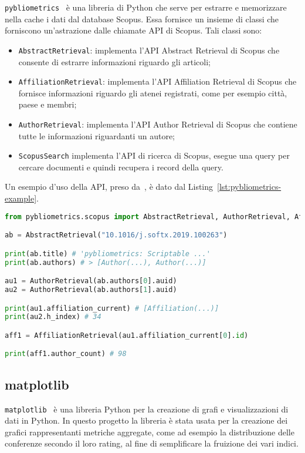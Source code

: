 \texttt{pybliometrics}~\cite{pybliometrics} è una libreria di Python che serve per estrarre e
memorizzare nella cache i dati dal database Scopus.
Essa fornisce un insieme di classi che forniscono un'astrazione dalle chiamate
API di Scopus. Tali classi sono:
\begin{itemize}
	\item \texttt{AbstractRetrieval}: implementa l'API Abstract Retrieval di
	Scopus che consente di estrarre informazioni riguardo gli articoli;
	\item \texttt{AffiliationRetrieval}: implementa l'API Affiliation Retrieval
	di Scopus che fornisce informazioni riguardo gli atenei registrati, come per
	esempio città, paese e membri;
	\item \texttt{AuthorRetrieval}: implementa l'API Author Retrieval di Scopus
	che contiene tutte le informazioni riguardanti un autore;
	\item \texttt{ScopusSearch} implementa l'API di ricerca di Scopus, esegue una
	query per cercare documenti e quindi recupera i record della query.
\end {itemize}

Un esempio d'uso della API, preso da~\cite{pybliometrics}, è dato dal
Listing~\ref{lst:pybliometrics-example}.

\begin{lstlisting}[language=Python, caption=Esempio d'uso di \texttt{pybliometrics}, label=lst:pybliometrics-example]
from pybliometrics.scopus import AbstractRetrieval, AuthorRetrieval, AffiliationRetrieval

ab = AbstractRetrieval("10.1016/j.softx.2019.100263")

print(ab.title) # 'pybliometrics: Scriptable ...'
print(ab.authors) # > [Author(...), Author(...)]

au1 = AuthorRetrieval(ab.authors[0].auid)
au2 = AuthorRetrieval(ab.authors[1].auid)

print(au1.affiliation_current) # [Affiliation(...)]
print(au2.h_index) # 34

aff1 = AffiliationRetrieval(au1.affiliation_current[0].id)

print(aff1.author_count) # 98
\end{lstlisting}

\subsection{matplotlib}

\texttt{matplotlib}~\cite{matplotlib} è una libreria Python per la creazione
di grafi e visualizzazioni di dati in Python. In questo progetto la libreria
è stata usata per la creazione dei grafici rappresentanti metriche aggregate,
come ad esempio la distribuzione delle conferenze secondo il loro rating, 
al fine di semplificare la fruizione dei vari indici.

